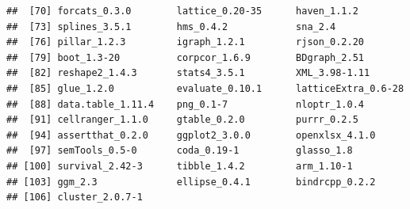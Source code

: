 \documentclass[]{article}
\begin{document}
\begin{verbatim}
##  [70] forcats_0.3.0        lattice_0.20-35      haven_1.1.2         
##  [73] splines_3.5.1        hms_0.4.2            sna_2.4             
##  [76] pillar_1.2.3         igraph_1.2.1         rjson_0.2.20        
##  [79] boot_1.3-20          corpcor_1.6.9        BDgraph_2.51        
##  [82] reshape2_1.4.3       stats4_3.5.1         XML_3.98-1.11       
##  [85] glue_1.2.0           evaluate_0.10.1      latticeExtra_0.6-28 
##  [88] data.table_1.11.4    png_0.1-7            nloptr_1.0.4        
##  [91] cellranger_1.1.0     gtable_0.2.0         purrr_0.2.5         
##  [94] assertthat_0.2.0     ggplot2_3.0.0        openxlsx_4.1.0      
##  [97] semTools_0.5-0       coda_0.19-1          glasso_1.8          
## [100] survival_2.42-3      tibble_1.4.2         arm_1.10-1          
## [103] ggm_2.3              ellipse_0.4.1        bindrcpp_0.2.2      
## [106] cluster_2.0.7-1
\end{verbatim}
\end{document}
